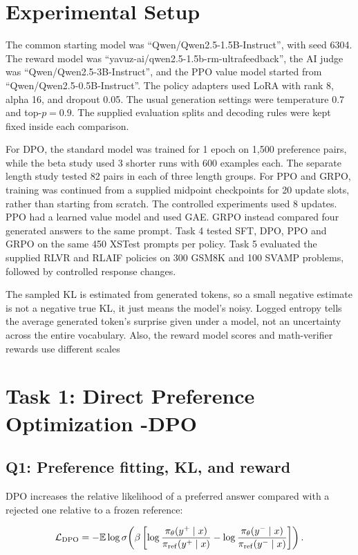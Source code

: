 \documentclass{article}
\begin{document}
\section{Experimental Setup}
The common starting model was ``Qwen/Qwen2.5-1.5B-Instruct'', with seed 6304. The reward model was ``yavuz-ai/qwen2.5-1.5b-rm-ultrafeedback'', the AI judge was ``Qwen/Qwen2.5-3B-Instruct'', and the PPO value model started from ``Qwen/Qwen2.5-0.5B-Instruct''. The policy adapters used LoRA with rank 8, alpha 16, and dropout 0.05. The usual generation settings were temperature 0.7 and top-$p=0.9$. The supplied evaluation splits and decoding rules were kept fixed inside each comparison.

For DPO, the standard model was trained for 1 epoch on 1,500 preference pairs, while the beta study used 3 shorter runs with 600 examples each. The separate length study tested 82 pairs in each of three length groups. For PPO and GRPO, training was continued from a supplied midpoint checkpoints for 20 update slots, rather than starting from scratch. The controlled experiments used 8 updates. PPO had a learned value model and used GAE. 
GRPO instead compared four generated answers to the same prompt. Task 4 tested SFT, DPO, PPO and GRPO on the same 450 XSTest prompts per policy. Task 5 evaluated the supplied RLVR and RLAIF policies on 300 GSM8K and 100 SVAMP problems, followed by controlled response changes.

The sampled KL is estimated from generated tokens, so a small negative estimate is not a negative true KL, it just means the model's noisy. Logged entropy tells the average generated token's surprise given under a model, not an uncertainty across the entire vocabulary. Also, the reward model scores and math-verifier rewards use different scales

\section{Task 1: Direct Preference Optimization -DPO}
\subsection{Q1: Preference fitting, KL, and reward}

DPO increases the relative likelihood of a preferred answer compared with a rejected one relative to a frozen reference:

\begin{equation}
\mathcal{L}_{\mathrm{DPO}}=-\mathbb{E}\log\sigma\!\left(\beta\left[\log\frac{\pi_\theta(y^+\mid x)}{\pi_{\rm ref}(y^+\mid x)}-\log\frac{\pi_\theta(y^-\mid x)}{\pi_{\rm ref}(y^-\mid x)}\right]\right).
\end{equation}
\end{document}
